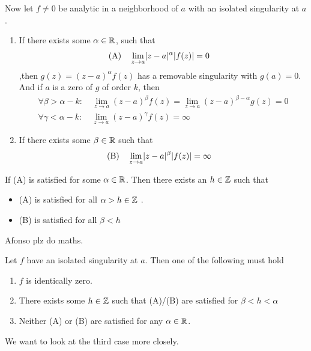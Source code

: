 \begin{theorem}[]
	Now let $f\neq 0$ be analytic in a neighborhood of $a$ with an isolated singularity at $a$.
\begin{enumerate}
	\item  If there exists some $\alpha \in \mathbb{R}$, such that 
	\begin{align*}
		\text{(A)} \quad	&\lim_{z \to a}\abs{z-a}^{\alpha} \abs{f(z)} = 0
	\end{align*}
	,then $g(z) = (z-a)^{\alpha}f(z)$ has a removable singularity with $g(a) = 0$. 
	And if $a$ is a zero of $g$ of order $k$, then 
	\begin{align*}
		\forall  \beta > \alpha - k: \quad \lim_{z \to a}(z-a)^{\beta} f(z) = \lim_{z \to a}(z-a)^{\beta - \alpha}g(z) = 0\\
		\forall  \gamma < \alpha - k: \quad \lim_{z \to a} (z-a)^{\gamma}f(z) = \infty
	\end{align*}
	\item If there exists some $\beta \in \mathbb{R}$ such that
	\begin{align*}
		\text{(B)} \quad &\lim_{z \to a} \abs{z-a}^{\beta} \abs{f(z)} = \infty
	\end{align*}

\end{enumerate}
\end{theorem}

\begin{corollary}[]
	If (A) is satisfied for some $\alpha \in \mathbb{R}$. Then there exists an $h \in \mathbb{Z}$ such that
	\begin{itemize}
		\item (A) is satisfied for all $\alpha > h \in \mathbb{Z}$ .
		\item (B) is satisfied for all $\beta < h$
	\end{itemize}
\end{corollary}
Afonso plz do maths.




\begin{theorem}[]
	Let $f$ have an isolated singularity at $a$. Then one of the following must hold
	\begin{enumerate}
		\item $f$ is identically zero.
		\item There exists some $h \in \mathbb{Z}$ such that (A)/(B) are satisfied for $\beta < h < \alpha$
		\item Neither (A) or (B) are satisfied for any $\alpha \in \mathbb{R}$.
	\end{enumerate}
\end{theorem}
We want to look at the third case more closely.

